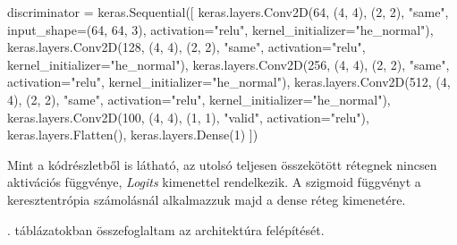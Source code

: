 \begin{python}
discriminator = keras.Sequential([
    keras.layers.Conv2D(64, (4, 4), (2, 2), "same",
                        input_shape=(64, 64, 3), activation="relu",
                        kernel_initializer="he_normal"),
    keras.layers.Conv2D(128, (4, 4), (2, 2), "same", activation="relu",
                        kernel_initializer="he_normal"),
    keras.layers.Conv2D(256, (4, 4), (2, 2), "same", activation="relu",
                        kernel_initializer="he_normal"),
    keras.layers.Conv2D(512, (4, 4), (2, 2), "same", activation="relu",
                        kernel_initializer="he_normal"),
    keras.layers.Conv2D(100, (4, 4), (1, 1), "valid", activation="relu"),
    keras.layers.Flatten(),
    keras.layers.Dense(1)
])
\end{python}

Mint a kódrészletből is látható, az utolsó teljesen összekötött rétegnek nincsen aktivációs függvénye, \textit{Logits} kimenettel rendelkezik. A szigmoid függvényt a keresztentrópia számolásnál alkalmazzuk majd a dense réteg kimenetére.

. táblázatokban összefoglaltam az architektúra felépítését.

